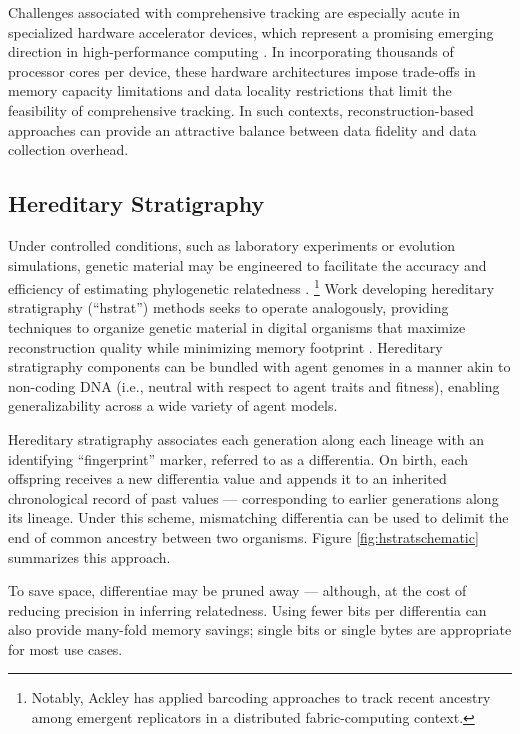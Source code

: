Challenges associated with comprehensive tracking are especially acute in specialized hardware accelerator devices, which represent a promising emerging direction in high-performance computing \citep{emani2024democratizing}.
In incorporating thousands of processor cores per device, these hardware architectures impose trade-offs in memory capacity limitations and data locality restrictions that limit the feasibility of comprehensive tracking.
In such contexts, reconstruction-based approaches can provide an attractive balance between data fidelity and data collection overhead.

\subsection{Hereditary Stratigraphy} \label{sec:introduction:hstrat}



Under controlled conditions, such as laboratory experiments or evolution simulations, genetic material may be engineered to facilitate the accuracy and efficiency of estimating phylogenetic relatedness \citep{li2024reconstructing,ackley2023robust}.%
\footnote{Notably, Ackley has applied barcoding approaches to track recent ancestry among emergent replicators in a distributed fabric-computing context.}
Work developing hereditary stratigraphy (``hstrat'') methods seeks to operate analogously, providing techniques to organize genetic material in digital organisms that maximize reconstruction quality while minimizing memory footprint \citep{moreno2022hereditary}.
Hereditary stratigraphy components can be bundled with agent genomes in a manner akin to non-coding DNA (i.e., neutral with respect to agent traits and fitness), enabling generalizability across a wide variety of agent models.

Hereditary stratigraphy associates each generation along each lineage with an identifying ``fingerprint'' marker, referred to as a differentia.
On birth, each offspring receives a new differentia value and appends it to an inherited chronological record of past values --- corresponding to earlier generations along its lineage.
Under this scheme, mismatching differentia can be used to delimit the end of common ancestry between two organisms.
Figure \ref{fig:hstratschematic} summarizes this approach.

To save space, differentiae may be pruned away --- although, at the cost of reducing precision in inferring relatedness.
Using fewer bits per differentia can also provide many-fold memory savings; single bits or single bytes are appropriate for most use cases.

